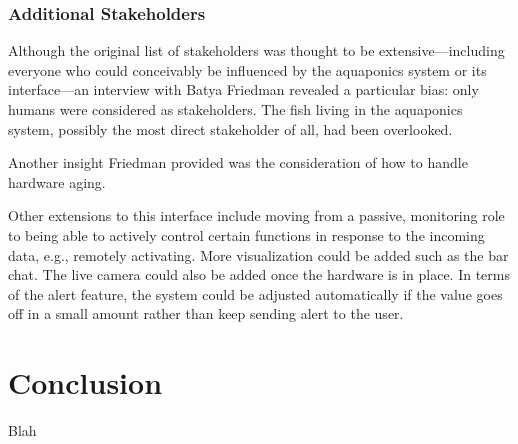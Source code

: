 \documentclass{sigchi}
\begin{document}
\subsubsection{Additional Stakeholders}
Although the original list of stakeholders was thought to be extensive---including everyone who could conceivably be influenced by the aquaponics system or its interface---an interview with Batya Friedman revealed a particular bias: only humans were considered as stakeholders. The fish living in the aquaponics system, possibly the most direct stakeholder of all, had been overlooked. 

Another insight Friedman provided was the consideration of how to handle hardware aging. 

Other extensions to this interface include moving from a passive, monitoring role to being able to actively control certain functions in response to the incoming data, e.g., remotely activating. More visualization could be added such as the bar chat. The live camera could also be added once the hardware is in place. In terms of the alert feature, the system could be adjusted automatically if the value goes off in a small amount rather than keep sending alert to the user.

\section{Conclusion}

Blah

%
%
%
%
%
\balance



\end{document}
